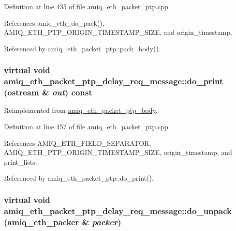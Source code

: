 Definition at line 435 of file amiq\_\-eth\_\-packet\_\-ptp.cpp.

References amiq\_\-eth\_\-do\_\-pack(), AMIQ\_\-ETH\_\-PTP\_\-ORIGIN\_\-TIMESTAMP\_\-SIZE, and origin\_\-timestamp.

Referenced by amiq\_\-eth\_\-packet\_\-ptp::pack\_\-body().\hypertarget{classamiq__eth__packet__ptp__delay__req__message_aac81caa439938e5eb0c2af2dbd9c82ee}{
\subsubsection[{do\_\-print}]{\setlength{\rightskip}{0pt plus 5cm}virtual void amiq\_\-eth\_\-packet\_\-ptp\_\-delay\_\-req\_\-message::do\_\-print (ostream \& {\em out}) const}}
\label{classamiq__eth__packet__ptp__delay__req__message_aac81caa439938e5eb0c2af2dbd9c82ee}


Reimplemented from \hyperlink{classamiq__eth__packet__ptp__body_a44ff8df4c84f236f8bab792ceb338e6a}{amiq\_\-eth\_\-packet\_\-ptp\_\-body}.

Definition at line 457 of file amiq\_\-eth\_\-packet\_\-ptp.cpp.

References AMIQ\_\-ETH\_\-FIELD\_\-SEPARATOR, AMIQ\_\-ETH\_\-PTP\_\-ORIGIN\_\-TIMESTAMP\_\-SIZE, origin\_\-timestamp, and print\_\-lists.

Referenced by amiq\_\-eth\_\-packet\_\-ptp::do\_\-print().\hypertarget{classamiq__eth__packet__ptp__delay__req__message_aadf94c8b12005e5bdcbc01e5ca8adef6}{
\subsubsection[{do\_\-unpack}]{\setlength{\rightskip}{0pt plus 5cm}virtual void amiq\_\-eth\_\-packet\_\-ptp\_\-delay\_\-req\_\-message::do\_\-unpack ({\bf amiq\_\-eth\_\-packer} \& {\em packer})}}
\label{classamiq__eth__packet__ptp__delay__req__message_aadf94c8b12005e5bdcbc01e5ca8adef6}


